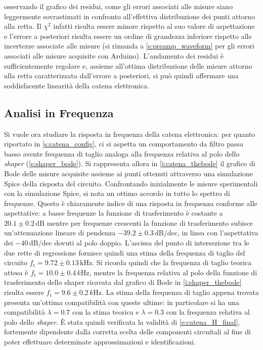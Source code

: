 \documentclass[a4paper,11pt]{article} %
\begin{document}
osservando il grafico dei residui, come gli errori associati alle misure siano leggermente sovrastimati in confronto
all'effettiva distribuzione dei punti attorno alla retta. Il $\chi^2$ infatti risulta essere minore rispetto al suo
valore di aspettazione e l'errore a posteriori risulta essere un ordine di grandezza inferiore rispetto alle incertezze
associate alle misure (si rimanda a \autoref{s:preamp_waveform} per gli errori associati alle misure acquisite con
Arduino). L'andamento dei residui è sufficientemente regolare e, assieme all'ottima distribuzione delle misure attorno
alla retta caratterizzata dall'errore a posteriori, si può quindi affermare una soddisfacente linearità della catena
elettronica.



\subsection{Analisi in Frequenza}\label{s:catena_bode}

Si vuole ora studiare la risposta in frequenza della catena elettronica: per quanto riportato in
\autoref{s:catena_config}, ci si aspetta un comportamento da filtro passa basso avente frequenza di taglio analoga alla
frequenza relativa al polo dello \textit{shaper} (\autoref{s:shaper_bode}). Si rappresenta allora in
\autoref{i:catena_thebode} il grafico di Bode delle misure acquisite assieme ai punti ottenuti attraverso una
simulazione Spice della risposta del circuito. 
Confrontando inizialmente le misure sperimentali con la simulazione Spice, si nota un ottimo accordo in tutto lo spettro
di frequenze. Questo è chiaramente indice di una risposta in frequenza conforme alle aspettative: a basse frequenze la
funzione di trasferimento è costante a $20.1 \pm 0.2 \,\text{dB}$ mentre per frequenze crescenti la funzione di
trasferimento subisce un'attenuazione lineare di pendenza $-39.2\pm 0.3\,\text{dB/dec}$, in linea con l'aspettativa dei
$-40\,\text{dB/dec}$ dovuti al polo doppio. L'ascissa del punto di intersezione tra le due rette di regressione fornisce
quindi una stima della frequenza di taglio del circuito $f_{\text{t}}= 9.72 \pm 0.13 \,\si{\kilo\Hz}$. Si ricorda quindi
che la frequenza di taglio teorica attesa è $f_{\text{t}} = 10.0 \pm 0.4 \,\si{k\Hz}$, mentre la frequenza relativa al
polo della funzione di trasferimento dello shaper ricavata dal grafico di Bode in \autoref{i:shaper_thebode} risulta
essere $f_{\text{t}} = 9.6 \pm 0.2 \,\si{k\Hz}$. La stima della frequenza di taglio appena trovata presenta un'ottima
compatibilità con queste ultime: in particolare si ha una compatibilità $\lambda = 0.7$ con la stima teorica e $\lambda
= 0.3$ con la frequenza relativa al polo dello \textit{shaper}. È stata quindi verificata la validità di
\autoref{e:catena_H_final}, fortemente dipendente dalla corretta scelta delle componenti circuitali al fine di poter
effettuare determinate approssimazioni e identificazioni. 
\end{document}
